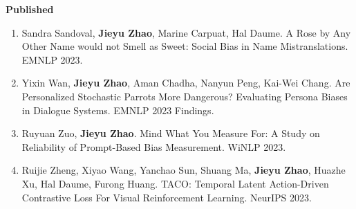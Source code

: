 \documentclass[11pt, a4paper]{article}
\newcommand{\me}{\textbf{Jieyu Zhao}}
\begin{document}
 \hspace{0.1in}\textbf{Published}
\begin{enumerate}
	\item Sandra Sandoval, \me, Marine Carpuat, Hal Daume. A Rose by Any Other Name would not Smell as Sweet: Social Bias in Name Mistranslations. EMNLP 2023.
    \item Yixin Wan, \me, Aman Chadha, Nanyun Peng,  Kai-Wei Chang. Are Personalized Stochastic Parrots More Dangerous? Evaluating Persona Biases in Dialogue Systems. EMNLP 2023 Findings.
    \item Ruyuan Zuo,  \me. Mind What You Measure For: A Study on Reliability of Prompt-Based Bias Measurement. WiNLP 2023.
    \item Ruijie Zheng, Xiyao Wang, Yanchao Sun, Shuang Ma, \me, Huazhe Xu, Hal Daume, Furong Huang. TACO: Temporal Latent Action-Driven Contrastive Loss For Visual Reinforcement Learning. NeurIPS 2023.
   

\end{enumerate}
\end{document}

